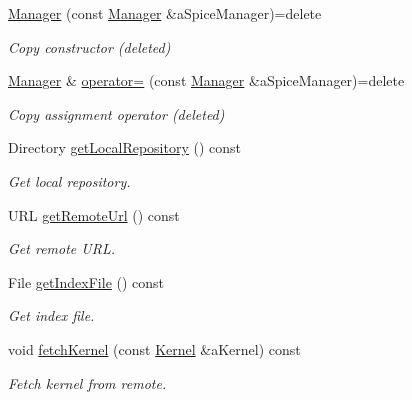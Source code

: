 \begin{DoxyCompactItemize}
\item 
\hyperlink{classostk_1_1physics_1_1env_1_1ephem_1_1spice_1_1_manager_a20d663efed8e9d8604c8b86d055e905b}{Manager} (const \hyperlink{classostk_1_1physics_1_1env_1_1ephem_1_1spice_1_1_manager}{Manager} \&a\+Spice\+Manager)=delete
\begin{DoxyCompactList}\small\item\em Copy constructor (deleted) \end{DoxyCompactList}\item 
\hyperlink{classostk_1_1physics_1_1env_1_1ephem_1_1spice_1_1_manager}{Manager} \& \hyperlink{classostk_1_1physics_1_1env_1_1ephem_1_1spice_1_1_manager_a07113610331854fbf1b2376790703b48}{operator=} (const \hyperlink{classostk_1_1physics_1_1env_1_1ephem_1_1spice_1_1_manager}{Manager} \&a\+Spice\+Manager)=delete
\begin{DoxyCompactList}\small\item\em Copy assignment operator (deleted) \end{DoxyCompactList}\item 
Directory \hyperlink{classostk_1_1physics_1_1env_1_1ephem_1_1spice_1_1_manager_a5b214027763ff5425dd488bb25c45d82}{get\+Local\+Repository} () const
\begin{DoxyCompactList}\small\item\em Get local repository. \end{DoxyCompactList}\item 
U\+RL \hyperlink{classostk_1_1physics_1_1env_1_1ephem_1_1spice_1_1_manager_ac8e69ec64b7f287eaded8bb10cdd5996}{get\+Remote\+Url} () const
\begin{DoxyCompactList}\small\item\em Get remote U\+RL. \end{DoxyCompactList}\item 
File \hyperlink{classostk_1_1physics_1_1env_1_1ephem_1_1spice_1_1_manager_a64f056cb9d851c9cf0842db81d85d468}{get\+Index\+File} () const
\begin{DoxyCompactList}\small\item\em Get index file. \end{DoxyCompactList}\item 
void \hyperlink{classostk_1_1physics_1_1env_1_1ephem_1_1spice_1_1_manager_a7c32b7266846a0c0d0471bff27d7ce21}{fetch\+Kernel} (const \hyperlink{classostk_1_1physics_1_1env_1_1ephem_1_1spice_1_1_kernel}{Kernel} \&a\+Kernel) const
\begin{DoxyCompactList}\small\item\em Fetch kernel from remote. \end{DoxyCompactList}\item 

\end{DoxyCompactItemize}

